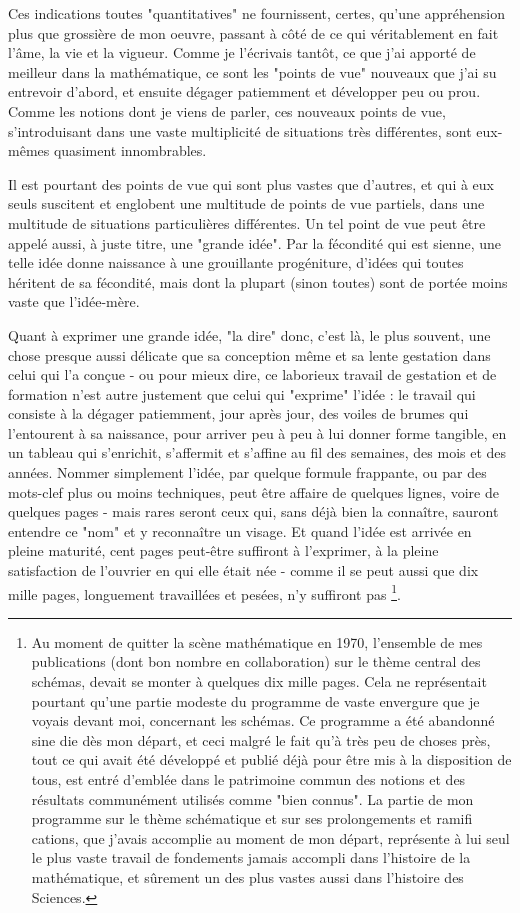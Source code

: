 Ces indications toutes "quantitatives" ne fournissent, certes, qu'une appréhension plus que grossière de mon oeuvre, passant à côté de ce qui véritablement en fait l'âme, la vie et la vigueur. Comme je l'écrivais tantôt, ce que j'ai apporté de meilleur dans la mathématique, ce sont les "points de vue" nouveaux que j'ai su entrevoir d'abord, et ensuite dégager patiemment et développer peu ou prou. Comme les notions dont je viens de parler, ces nouveaux points de vue, s'introduisant dans une vaste multiplicité de situations très différentes, sont eux-mêmes quasiment innombrables.

Il est pourtant des points de vue qui sont plus vastes que d'autres, et qui à eux seuls suscitent et englobent une multitude de points de vue partiels, dans une multitude de situations particulières différentes. Un tel point de vue peut être appelé aussi, à juste titre, une "grande idée". Par la fécondité qui est sienne, une telle idée donne naissance à une grouillante progéniture, d’idées qui toutes héritent de sa fécondité, mais dont la plupart (sinon toutes) sont de portée moins vaste que l'idée-mère.

Quant à exprimer une grande idée, "la dire" donc, c'est là, le plus souvent, une chose presque aussi délicate que sa conception même et sa lente gestation dans celui qui l'a conçue - ou pour mieux dire, ce laborieux travail de gestation et de formation n'est autre justement que celui qui "exprime" l'idée : le travail qui consiste à la dégager patiemment, jour après jour, des voiles de brumes qui l'entourent à sa naissance, pour arriver peu à peu à lui donner forme tangible, en un tableau qui s'enrichit, s'affermit et s'affine au fil des semaines, des mois et des années. Nommer simplement l'idée, par quelque formule frappante, ou par des mots-clef plus ou moins techniques, peut être affaire de quelques lignes, voire de quelques pages - mais rares seront ceux qui, sans déjà bien la connaître, sauront entendre ce "nom" et y reconnaître un visage. Et quand l'idée est arrivée en pleine maturité, cent pages peut-être suffiront à l'exprimer, à la pleine satisfaction de l'ouvrier en qui elle était née - comme il se peut aussi que dix mille pages, longuement travaillées et pesées, n'y suffiront pas \footnote{Au moment de quitter la scène mathématique en 1970, l'ensemble de mes publications (dont bon nombre en collaboration) sur le thème central des schémas, devait se monter à quelques dix mille pages. Cela ne représentait pourtant qu'une partie modeste du programme de vaste envergure que je voyais devant moi, concernant les schémas. Ce programme a été abandonné sine die dès mon départ, et ceci malgré le fait qu'à très peu de choses près, tout ce qui avait été développé et publié déjà pour être mis à la disposition de tous, est entré d'emblée dans le patrimoine commun des notions et des résultats communément utilisés comme "bien connus".
La partie de mon programme sur le thème schématique et sur ses prolongements et ramifi cations, que j'avais accomplie au moment de mon départ, représente à lui seul le plus vaste travail de fondements jamais accompli dans l'histoire de la mathématique, et sûrement un des plus vastes aussi dans l'histoire des Sciences.}.

